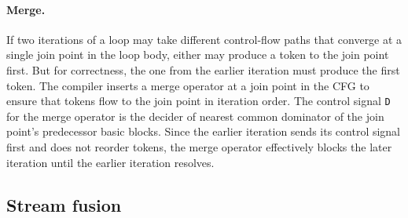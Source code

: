 \paragraph{Merge.}
%
%
If two iterations of a loop may take different control-flow
paths that converge at a single join point in the loop body, either may
produce a token to the join point first.
% 
But for correctness, the one from the
earlier iteration must produce the first token.
%
The compiler inserts a merge operator at a join point in the CFG to ensure that 
tokens flow to the join point in iteration order.
%
The control signal {\tt D} for the merge operator is the decider of
nearest common dominator of the join point's predecessor basic blocks.
%
%
Since the earlier iteration sends its control signal first and \riptide does not reorder tokens, the merge operator effectively blocks the later iteration until the earlier iteration resolves. %
%

\figRipTideArch

\subsection{Stream fusion}
\label{sec:compiler:stream}

